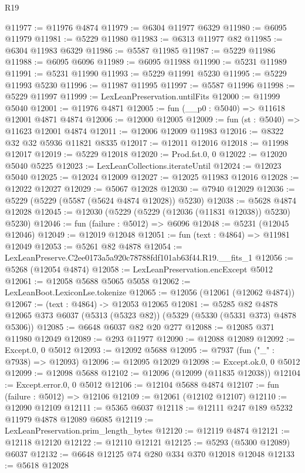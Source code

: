\begin{lexlean}{R19}
\begin{coremodule}
@11977 := @11976 @4874
@11979 := @6304 @11977 @6329
@11980 := @6095 @11979
@11981 := @5229 @11980
@11983 := @6313 @11977 @82
@11985 := @6304 @11983 @6329
@11986 := @5587 @11985
@11987 := @5229 @11986
@11988 := @6095 @6096
@11989 := @6095 @11988
@11990 := @5231 @11989
@11991 := @5231 @11990
@11993 := @5229 @11991 @5230
@11995 := @5229 @11993 @5230
@11996 := @11987 @11995
@11997 := @5587 @11996
@11998 := @5229 @11997
@11999 := LexLeanPreservation.untilFits
@12000 := @11999 @5040
@12001 := @11976 @4871
@12005 := fun (__p0 : @5040) => @11618 @12001 @4871 @4874
@12006 := @12000 @12005
@12009 := fun (st : @5040) => @11623 @12001 @4874
@12011 := @12006 @12009 @11983
@12016 := @8322 @32 @32 @5936 @11821 @8335
@12017 := @12011 @12016
@12018 := @11998 @12017
@12019 := @5229 @12018
@12020 := Prod.fst.{0, 0}
@12022 := @12020 @5040 @5225
@12023 := LexLeanCollections.iterateUntil
@12024 := @12023 @5040
@12025 := @12024 @12009
@12027 := @12025 @11983 @12016
@12028 := @12022 @12027
@12029 := @5067 @12028
@12030 := @7940 @12029
@12036 := @5229 (@5229 (@5587 (@5624 @4874 @12028)) @5230)
@12038 := @5628 @4874 @12028
@12045 := @12030 (@5229 (@5229 (@12036 (@11831 @12038)) @5230) @5230)
@12046 := fun (failure : @5012) => @6096
@12048 := @5231 (@12045 @12046)
@12049 := @12019 @12048
@12051 := fun (text : @4864) => @11981 @12049
@12053 := @5261 @82 @4878
@12054 := LexLeanPreserve.C2ee0173a5a920c78788fdf101ab63f44.R19.__fits_1
@12056 := @5268 (@12054 @4874)
@12058 := LexLeanPreservation.encExcept @5012
@12061 := @12058 @5688 @5065 @5058
@12062 := LexLeanBoot.LexiconLse.tokenize
@12065 := @12056 (@12061 (@12062 @4874))
@12067 := (text : @4864) -> @12053 @12065
@12081 := @5285
    @82
    @4878
    @12065
    @373
    @6037
    (@5313 (@5323 @82))
    (@5329 (@5330 (@5331 @373) @4878 @5306))
@12085 := @6648 @6037 @82 @20 @277
@12088 := @12085 @371 @11980 @12049
@12089 := @293 @11977
@12090 := @12088 @12089
@12092 := Except.{0, 0} @5012
@12093 := @12092 @5688
@12095 := @7937 (fun ("_" : @7938) => @12093)
@12096 := @12095 @12029
@12098 := Except.ok.{0, 0} @5012
@12099 := @12098 @5688
@12102 := @12096 (@12099 (@11835 @12038))
@12104 := Except.error.{0, 0} @5012
@12106 := @12104 @5688 @4874
@12107 := fun (failure : @5012) => @12106
@12109 := @12061 (@12102 @12107)
@12110 := @12090 @12109
@12111 := @5365 @6037
@12118 := @12111 @247 @189 @5232 @11979 @4878 @12089 @6085
@12119 := LexLeanPreservation.prim_length_bytes
@12120 := @12119 @4874
@12121 := @12118 @12120
@12122 := @12110 @12121
@12125 := @5293 (@5300 @12089) @6037
@12132 := @6648 @12125 @74 @280 @334 @370 @12018 @12048
@12133 := @5618 @12028

\end{coremodule}
\end{lexlean}
